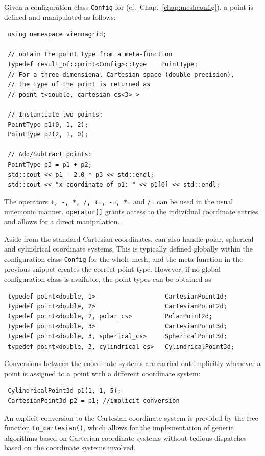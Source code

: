 Given a configuration class \lstinline|Config| for {\ViennaGrid} (cf.~Chap.~\ref{chap:meshconfig}), a point is defined and manipulated as follows:
\begin{lstlisting}
 using namespace viennagrid;

 // obtain the point type from a meta-function
 typedef result_of::point<Config>::type    PointType;
 // For a three-dimensional Cartesian space (double precision),
 // the type of the point is returned as
 // point_t<double, cartesian_cs<3> >

 // Instantiate two points:
 PointType p1(0, 1, 2);
 PointType p2(2, 1, 0);

 // Add/Subtract points:
 PointType p3 = p1 + p2;
 std::cout << p1 - 2.0 * p3 << std::endl;
 std::cout << "x-coordinate of p1: " << p1[0] << std::endl;
\end{lstlisting}
The operators \lstinline|+, -, *, /, +=, -=, *=| and \lstinline|/=| can be used in the usual mnemonic manner. \lstinline|operator[]| grants access to the individual coordinate entries and allows for a direct manipulation.

Aside from the standard Cartesian coordinates, {\ViennaGrid} can also handle polar, spherical and cylindrical coordinate systems.
This is typically defined globally within the configuration class \lstinline|Config| for the whole mesh, and the meta-function in the previous snippet creates the correct point type. However, if no global configuration class is available, the point types can be obtained as
\begin{lstlisting}
 typedef point<double, 1>                   CartesianPoint1d;
 typedef point<double, 2>                   CartesianPoint2d;
 typedef point<double, 2, polar_cs>         PolarPoint2d;
 typedef point<double, 3>                   CartesianPoint3d;
 typedef point<double, 3, spherical_cs>     SphericalPoint3d;
 typedef point<double, 3, cylindrical_cs>   CylindricalPoint3d;
\end{lstlisting}
Conversions between the coordinate systems are carried out implicitly whenever a point is assigned to a point with a different coordinate system:
\begin{lstlisting}
 CylindricalPoint3d p1(1, 1, 5);
 CartesianPoint3d p2 = p1; //implicit conversion
\end{lstlisting}
An explicit conversion to the Cartesian coordinate system is provided by the free function \lstinline|to_cartesian()|, which allows for the implementation of generic algorithms based on Cartesian coordinate systems without tedious dispatches based on the coordinate systems involved.

